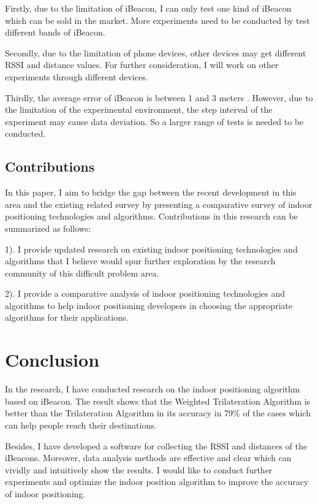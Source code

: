 \documentclass{sigchi}
\begin{document}
Firstly, due to the limitation of iBeacon, I can only test one kind of iBeacon which can be sold in the market. More experiments need to be conducted by test different bands of iBeacon.

Secondly, due to the limitation of phone devices, other devices may get different RSSI and distance values. For further consideration, I will work on other experiments through different devices.

Thirdly, the average error of iBeacon is between 1 and 3 meters \cite{grzechca2016analysis}. However, due to the limitation of the experimental environment, the step interval of the experiment may cause data deviation. So a larger range of tests is needed to be conducted.

\subsection{Contributions}
In this paper, I aim to bridge the gap between the recent development in this area and the existing related survey by presenting a comparative survey of indoor positioning technologies and algorithms. Contributions in this research can be summarized as follows:

1). I provide updated research on existing indoor positioning technologies and algorithms that I believe would spur further exploration by the research community of this difficult problem area.

2). I provide a comparative analysis of indoor positioning technologies and algorithms to help indoor positioning developers in choosing the appropriate algorithms for their applications.

\section{Conclusion}

In the research, I have conducted research on the indoor positioning algorithm based on iBeacon. The result shows that the Weighted Trilateration Algorithm is better than the Trilateration Algorithm in its accuracy in 79\% of the cases which can help people reach their destinations.

Besides, I have developed a software for collecting the RSSI and distances of the iBeacons. Moreover, data analysis methods are effective and clear which can vividly and intuitively show the results. I would like to conduct further experiments and optimize the indoor position algorithm to improve the accuracy of indoor positioning.
\end{document}
